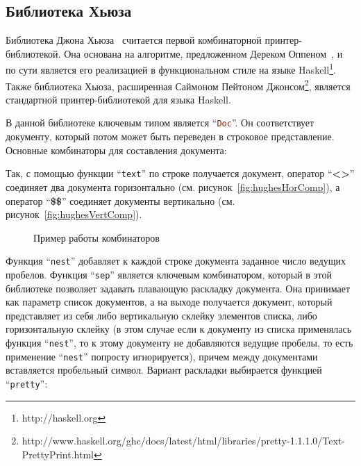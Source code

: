 \subsection{Библиотека Хьюза}

Библиотека Джона Хьюза~\cite{hughes} считается первой комбинаторной принтер-библиотекой. Она основана на алгоритме, предложенном Дереком Оппеном~\cite{oppen}, и по сути является его реализацией в функциональном стиле на языке Haskell\footnote{http://haskell.org}. Также библиотека Хьюза, расширенная Саймоном Пейтоном Джонсом\footnote{http://www.haskell.org/ghc/docs/latest/html/libraries/pretty-1.1.1.0/Text-PrettyPrint.html}, является стандартной принтер-библиотекой для языка Haskell.


В данной библиотеке ключевым типом является “\lstinline[language=Haskell]{Doc}”. Он соответствует документу, который потом может быть переведен в строковое представление.
Основные комбинаторы для составления документа:


Так, с помощью функции “\lstinline[language=Haskell]{text}” по строке получается документ, оператор “\textbf{<>}” соединяет два документа горизонтально (см. рисунок~\ref{fig:hughesHorComp}), а оператор “\textbf{\$\$}” соединяет документы вертикально (см. рисунок~\ref{fig:hughesVertComp}).

\begin{figure}[ht]
	\quad

	\caption{Пример работы комбинаторов}
\end{figure}

Функция “\lstinline[language=Haskell]{nest}” добавляет к каждой строке документа заданное число ведущих пробелов. Функция “\lstinline[language=Haskell]{sep}” является ключевым комбинатором, который в этой библиотеке позволяет задавать плавающую раскладку документа. Она принимает как параметр список документов, а на выходе получается документ, который представляет из себя либо вертикальную склейку элементов списка, либо горизонтальную склейку (в этом случае если к документу из списка применялась функция “\lstinline[language=Haskell]{nest}”, то к этому документу не добавляются ведущие пробелы, то есть применение “\lstinline[language=Haskell]{nest}” попросту игнорируется), причем между документами вставляется пробельный символ. Вариант раскладки выбирается функцией “\lstinline[language=Haskell]{pretty}”:

